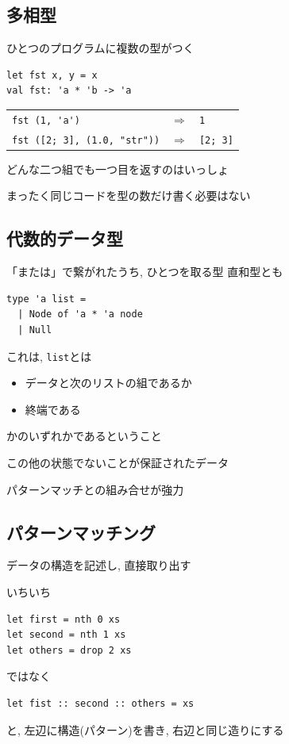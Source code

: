 \documentclass[papersize,30pt,slide]{jsarticle}
\begin{document}
\newpage
\subsection{多相型}
ひとつのプログラムに複数の型がつく

\begin{lstlisting}
let fst x, y = x
val fst: 'a * 'b -> 'a
\end{lstlisting}
\begin{tabular}{lcl}
\lstinline|fst (1, 'a')| &$\Longrightarrow$& \lstinline|1|\\
\lstinline|fst ([2; 3], (1.0, "str"))| &$\Longrightarrow$&
	 \lstinline|[2; 3]|
\end{tabular}

\vspace{1em}

どんな二つ組でも一つ目を返すのはいっしょ


\vspace{1em}

まったく同じコードを型の数だけ書く必要はない

\newpage

\subsection{代数的データ型}
「または」で繋がれたうち, ひとつを取る型 直和型とも

\begin{lstlisting}
type 'a list =
  | Node of 'a * 'a node
  | Null
\end{lstlisting}
これは, \lstinline|list|とは
\begin{itemize}
\item データと次のリストの組であるか
\item 終端である
\end{itemize}
かのいずれかであるということ

この他の状態でないことが保証されたデータ

パターンマッチとの組み合せが強力


\newpage
\subsection{パターンマッチング}
データの構造を記述し, 直接取り出す

いちいち
\begin{lstlisting}
let first = nth 0 xs
let second = nth 1 xs
let others = drop 2 xs
\end{lstlisting}
ではなく
\begin{lstlisting}
let fist :: second :: others = xs
\end{lstlisting}
と, 左辺に構造(パターン)を書き, 右辺と同じ造りにする
\end{document}
